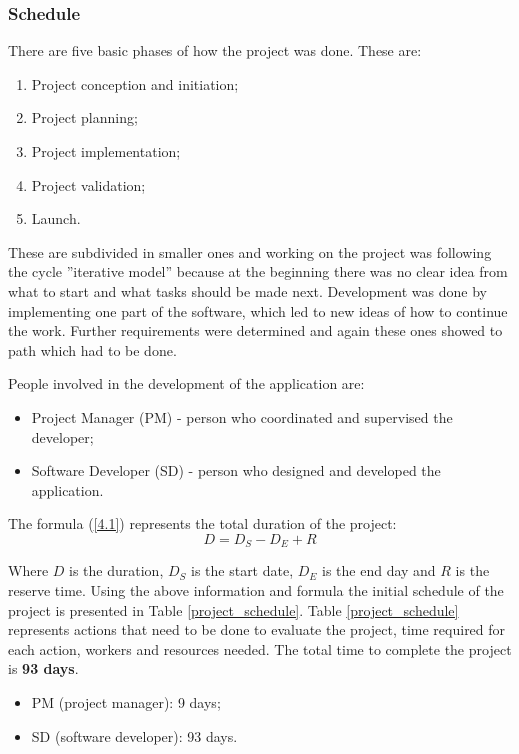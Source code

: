 \subsubsection{Schedule}
There are five basic phases of how the project was done. These are:
\begin{enumerate}
  \item Project conception and initiation;
  \item Project planning;
  \item Project implementation;
  \item Project validation; 
  \item Launch. 
\end{enumerate}
These are subdivided in smaller ones and working on the project was following the cycle ”iterative model” because at the beginning there was no clear idea from what to start and what tasks should be made next. Development was done by implementing one part of the software, which led to new ideas of how to continue the work. Further requirements were determined and again these ones showed to path which had to be done. 

People involved in the development of the application are:
\begin{itemize}
  \item Project Manager (PM) - person who coordinated and supervised the developer; 
  \item Software Developer (SD) - person who designed and developed the application. 
\end{itemize}
The formula (\ref{4.1}) represents the total duration of the project:
\begin{equation}
D = D_{S} - D_{E} + R  \label{4.1}
\end{equation}

Where $D$ is the duration, $D_{S}$ is the start date, $D_{E}$ is the end day and $R$ is the reserve time. Using the above information and formula the initial schedule of the project is presented in Table \ref{project_schedule}.  Table \ref{project_schedule} represents actions that need to be done to evaluate the project, time required for each action, workers and resources needed. The total time to complete the project is {\bf93 days}.

\begin{itemize}
  \item PM (project manager): 9 days;
  \item SD (software developer): 93 days.
\end{itemize}

